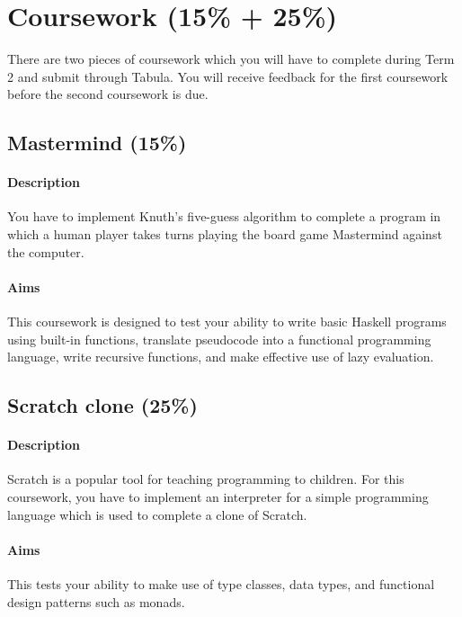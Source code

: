 \pagebreak
\section{Coursework (15\% + 25\%)}

There are two pieces of coursework which you will have to complete during Term 2 and submit through Tabula. You will receive feedback for the first coursework before the second coursework is due.

\subsection{Mastermind (15\%)}

\paragraph{Description} You have to implement Knuth's five-guess algorithm to complete a program in which a human player takes turns playing the board game Mastermind against the computer. 

\paragraph{Aims} This coursework is designed to test your ability to write basic Haskell programs using built-in functions, translate pseudocode into a functional programming language, write recursive functions, and make effective use of lazy evaluation. 

\subsection{Scratch clone (25\%)}

\paragraph{Description} Scratch is a popular tool for teaching programming to children. For this coursework, you have to implement an interpreter for a simple programming language which is used to complete a clone of Scratch. 

\paragraph{Aims} This tests your ability to make use of type classes, data types, and functional design patterns such as monads.